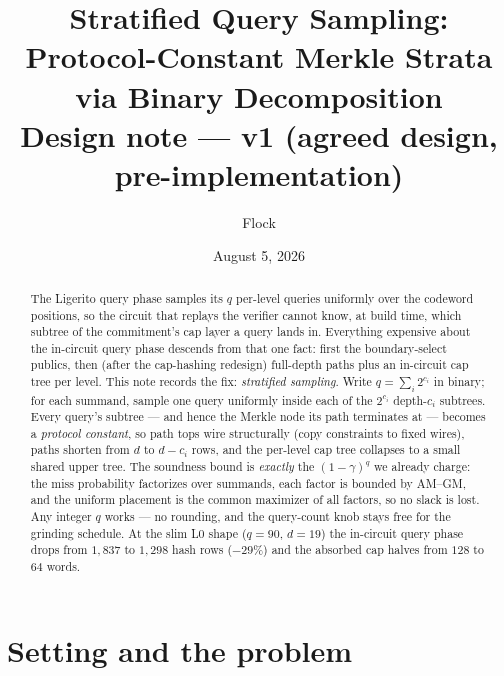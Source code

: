 \documentclass[11pt]{article}
\title{Stratified Query Sampling:\\
Protocol-Constant Merkle Strata via Binary Decomposition\\[0.6ex]
\large Design note --- v1 (agreed design, pre-implementation)}
\author{Flock}
\date{August 5, 2026}
\theoremstyle{definition}
\begin{document}
\maketitle

\begin{abstract}
The Ligerito query phase samples its $q$ per-level queries uniformly over
the codeword positions, so the circuit that replays the verifier cannot
know, at build time, which subtree of the commitment's cap layer a query
lands in. Everything expensive about the in-circuit query phase descends
from that one fact: first the boundary-select publics, then (after the
cap-hashing redesign) full-depth paths plus an in-circuit cap tree per
level. This note records the fix: \emph{stratified sampling}. Write
$q = \sum_i 2^{c_i}$ in binary; for each summand, sample one query
uniformly inside each of the $2^{c_i}$ depth-$c_i$ subtrees. Every
query's subtree --- and hence the Merkle node its path terminates at ---
becomes a \emph{protocol constant}, so path tops wire structurally
(copy constraints to fixed wires), paths shorten from $d$ to $d - c_i$
rows, and the per-level cap tree collapses to a small shared upper tree.
The soundness bound is \emph{exactly} the $(1-\gamma)^q$ we already
charge: the miss probability factorizes over summands, each factor is
bounded by AM--GM, and the uniform placement is the common maximizer of
all factors, so no slack is lost. Any integer $q$ works --- no rounding,
and the query-count knob stays free for the grinding schedule. At the
slim L0 shape ($q = 90$, $d = 19$) the in-circuit query phase drops from
$1{,}837$ to $1{,}298$ hash rows ($-29\%$) and the absorbed cap halves
from $128$ to $64$ words.
\end{abstract}

\section{Setting and the problem}
\end{document}
